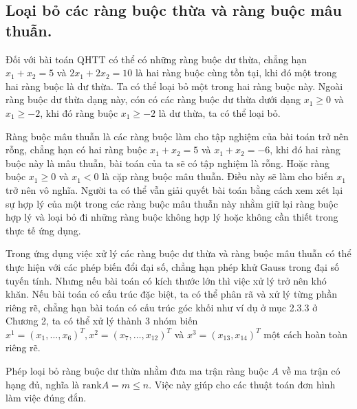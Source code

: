 \subsection{Loại bỏ các ràng buộc thừa và ràng buộc mâu thuẫn. }
Đối với bài toán QHTT có thể có những ràng buộc dư thừa, chẳng hạn $x_1+x_2=5$ và $2x_1+2x_2=10$ là hai ràng buộc cùng tồn tại, khi đó một trong hai ràng buộc là dư thừa. Ta có thể loại bỏ một trong hai ràng buộc này. Ngoài ràng buộc dư thừa dạng này, cón có các ràng buộc dư thừa dưới dạng $x_1\geq 0$ và $x_1\geq -2$, khi đó ràng buộc $x_1\geq -2$ là dư thừa, ta có thể loại bỏ.

Ràng buộc mâu thuẫn là các ràng buộc làm cho tập nghiệm của bài toán trở nên rỗng, chẳng hạn có hai ràng buộc $x_1+x_2=5$ và $x_1+x_2=-6$, khi đó hai ràng buộc này là mâu thuẫn, bài toán của ta sẽ có tập nghiệm là rỗng. Hoặc ràng buộc $x_1\geq 0$ và $x_1<0$ là cặp ràng buộc mâu thuẫn. Điều này sẽ làm cho biến $x_1$ trở nên vô nghĩa. Người ta có thể vẫn giải quyết bài toán bằng cách xem xét lại sự hợp lý của một trong các ràng buộc mâu thuẫn này nhằm giữ lại ràng buộc hợp lý và loại bỏ đi những ràng buộc không hợp lý hoặc không cần thiết trong thực tế ứng dụng.

Trong ứng dụng việc xử lý các ràng buộc dư thừa và ràng buộc mâu thuẫn có thể thực hiện với các phép biến đổi đại số, chẳng hạn phép khử Gauss trong đại số tuyến tính. Nhưng nếu bài toán có kích thước lớn thì việc xử lý trở nên khó khăn. Nếu bài toán có cấu trúc đặc biệt, ta có thể phân rã và xử lý từng phần riêng rẽ, chẳng hạn bài toán có cấu trúc góc khối như ví dụ ở mục 2.3.3 ở Chương 2, ta có thể xử lý thành 3 nhóm biến $x^1=(x_1,\dots, x_6)^T, x^2=(x_7,\dots, x_{12})^T$ và $x^3=(x_{13}, x_{14})^T$ một cách hoàn toàn riêng rẽ.

Phép loại bỏ ràng buộc dư thừa nhằm đưa ma trận ràng buộc $A$ về ma trận có hạng đủ, nghĩa là $\text{rank}A=m\leq n$. Việc này giúp cho các thuật toán đơn hình làm việc đúng đắn.

